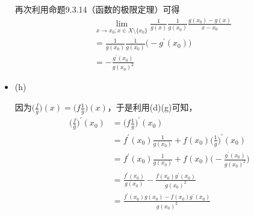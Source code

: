 \documentclass{article}
\begin{document}
\begin{itemize}
        再次利用命题9.3.14（函数的极限定理）可得
        \begin{align*}
           & \lim\limits_{x \to x_0; x \in X \setminus \{x_0\}} \frac{1}{g(x)} \frac{1}{g(x_0)} \frac{g(x_0) - g(x)}{x - x_0} \\
           & = \frac{1}{g(x_0)} \frac{1}{g(x_0)} \big( - g^\prime(x_0)\big)                                                   \\
           & = -\frac{g^\prime(x_0)}{g(x_0)^{2}}
        \end{align*}

  \item (h)

        因为$\big(\frac{f}{g}\big)(x) = \big(f\frac{1}{g}\big)(x)$，于是利用(d)(g)可知，
        \begin{align*}
          \big(\frac{f}{g}\big)^\prime(x_0) & = \big(f\frac{1}{g}\big)^\prime(x_0)                                           \\
                                            & = f^\prime(x_0)\frac{1}{g(x_0)} + f(x_0)\big(\frac{1}{g}\big)^\prime(x_0)            \\
                                            & = f^\prime(x_0)\frac{1}{g(x_0)} + f(x_0) \big(-\frac{g^\prime(x_0)}{g(x_0)^{2}}\big) \\
                                            & = \frac{f^\prime(x_0)}{g(x_0)} - \frac{f(x_0) g^\prime(x_0)}{g(x_0)^{2}}             \\
                                            & = \frac{f^\prime(x_0) g(x_0) - f(x_0) g^\prime(x_0)}{g(x_0)^{2}}
        \end{align*}


\end{itemize}
\end{document}
